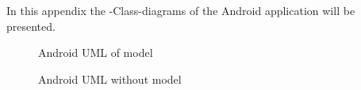\label{chap:and_appendix}

In this appendix the -Class-diagrams of the Android application will be
presented. 

\begin{figure}[h]
    \caption{Android UML of model}
    \label{fig:and_umlmodel}
\end{figure}  
\begin{figure}[h]	
    \caption{Android UML without model}
    \label{fig:and_uml}
\end{figure}  
\FloatBarrier
